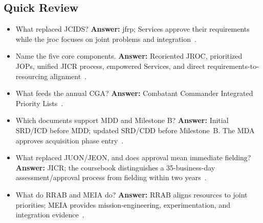 \documentclass[../main.tex]{subfiles}
\begin{document}
\subsection{Quick Review}
\begin{itemize}
  \item What replaced JCIDS? \textbf{Answer:} \ac{jfrp}; Services approve their requirements while the \ac{jroc} focuses on joint problems and integration~\autocite{edo-3-3-3-jfrp-2026}.
  \item Name the five core components. \textbf{Answer:} Reoriented JROC, prioritized JOPs, unified JICR process, empowered Services, and direct requirements-to-resourcing alignment~\autocite{edo-3-3-3-jfrp-2026}.
  \item What feeds the annual CGA? \textbf{Answer:} Combatant Commander Integrated Priority Lists~\autocite{edo-3-3-3-jfrp-2026}.
  \item Which documents support MDD and Milestone B? \textbf{Answer:} Initial SRD/ICD before MDD; updated SRD/CDD before Milestone~B. The MDA approves acquisition phase entry~\autocite{edo-3-3-3-jfrp-2026}.
  \item What replaced JUON/JEON, and does approval mean immediate fielding? \textbf{Answer:} JICR; the coursebook distinguishes a 35-business-day assessment/approval process from fielding within two years~\autocite{edo-3-3-3-jfrp-2026}.
  \item What do RRAB and MEIA do? \textbf{Answer:} RRAB aligns resources to joint priorities; MEIA provides mission-engineering, experimentation, and integration evidence~\autocite[slides 33--35]{edo-3-3-3-jfrp-2026}.
\end{itemize}

\end{document}
